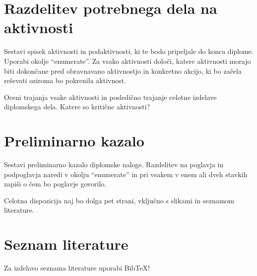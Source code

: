 \documentclass[11pt,a4paper]{article}
\begin{document}
\section{Razdelitev potrebnega dela na aktivnosti}

Sestavi spisek aktivnosti in podaktivnosti, ki te bodo pripeljale do konca diplome. Uporabi okolje ``enumerate''.
Za vsako aktivnosti določi, katere aktivnosti morajo biti dokončane pred obravnavano aktivnostjo in  konkretno akcijo, ki bo začela reševati oziroma bo pokrenila aktivnost.

Oceni trajanja vsake aktivnosti in posledično trajanje celotne izdelave diplomskega dela. Katere so kritične aktivnosti?


\section{Preliminarno kazalo}

Sestavi preliminarno kazalo diplomske naloge. Razdelitev na poglavja in podpoglavja naredi v okolju ``enumerate'' in pri vsakem v enem ali dveh stavkih zapiši o čem bo poglavje govorilo.

Celotna dispozicija naj bo dolga pet strani, vključno s slikami in seznamom literature.


\section{Seznam literature}

Za izdelavo seznama literature uporabi  Bib\TeX!




\end{document}
